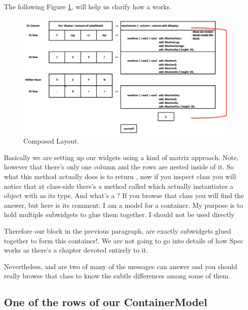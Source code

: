 \documentclass[a4paper,10pt,twoside]{book}
\begin{document}
The following Figure \ref{layout}, will help us clarify how a  works.  


\begin{figure}

\begin{center}
\includegraphics[width=1.1\textwidth]{figures/layoutDiagram.png}\caption{Composed Layout.\label{layout}}\end{center}
\end{figure}


Basically we are setting up our widgets using a kind of matrix approach. Note, however that there's only one column and the rows are nested inside of it. So what this method actually does is to return , now if you inspect  class you will notice that at class-side there's a method called  which actually instantiates a  object with  as its type. And what's a ? If you browse that class you will find the answer, but here is its comment: I am a model for a container. My purpose is to hold multiple subwidgets to glue them together. I should not be used directly

Therefore our \ct{{[}...{]}} block in the previous paragraph, are exactly subwidgets glued together to form this container!. We are not going to go into details of how Spec works as there's a chapter devoted entirely to it.

Nevertheless,  and  are two of many of the messages  can answer and you should really browse that class to know the subtle differences among some of them.
\subsection{One of the rows of our ContainerModel}
\end{document}
